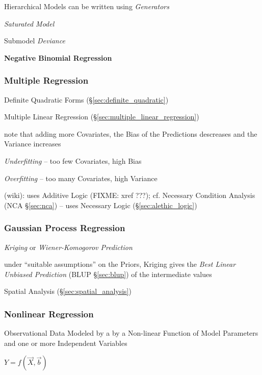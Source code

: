 Hierarchical Models can be written using \emph{Generators}

\emph{Saturated Model}

Submodel \emph{Deviance}

\textbf{Negative Binomial Regression}



\subsubsection{Multiple Regression}\label{sec:multiple_regression}

Definite Quadratic Forms (\S\ref{sec:definite_quadratic})

Multiple Linear Regression (\S\ref{sec:multiple_linear_regression})

note that adding more Covariates, the Bias of the Predictions descreases and the
Variance increases

\emph{Underfitting} -- too few Covariates, high Bias

\emph{Overfitting} -- too many Covariates, high Variance

(wiki): uses Additive Logic (FIXME: xref ???); cf. Necessary Condition Analysis
(NCA \S\ref{sec:nca}) -- uses Necessary Logic (\S\ref{sec:alethic_logic})



\subsubsection{Gaussian Process Regression}
\label{sec:gaussian_process_regression}

\emph{Kriging} or \emph{Wiener-Komogorov Prediction}

under ``suitable assumptions'' on the Priors, Kriging gives the \emph{Best
  Linear Unbiased Prediction} (BLUP \S\ref{sec:blup}) of the intermediate values

\fist Spatial Analysis (\S\ref{sec:spatial_analysis})



\subsubsection{Nonlinear Regression}\label{sec:nonlinear_regression}

Observational Data Modeled by a by a Non-linear Function of Model Parameters and
one or more Independent Variables

$Y = f(\vec{X}, \vec{b})$

